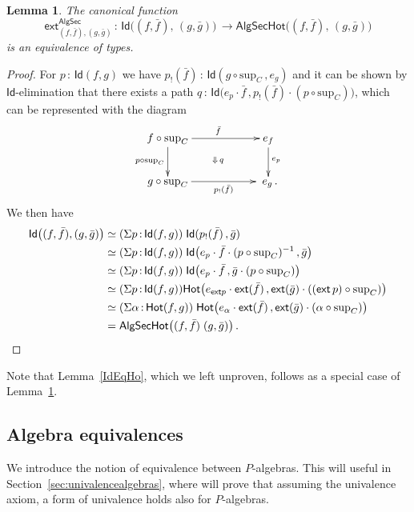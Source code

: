 \documentclass[10pt,a4paper,oneside,reqno]{amsart}
\numberwithin{equation}{section}
\theoremstyle{mythm}
\newtheorem{lemma}[theorem]{Lemma}
\theoremstyle{mydef}
\theoremstyle{myrmk}
\newcommand{\co}{\,{:}\,}
\newcommand{\ct}{\cdot}
\newcommand{\Hot}{\mathsf{Hot}}
\newcommand{\ext}{\mathsf{ext}}
\newcommand{\Id}{\mathsf{Id}}
\renewcommand{\sup}{\mathrm{sup}}
\newcommand{\PalgSec}{\mathsf{AlgSec}}
\newcommand{\AlgSecHot}{\mathsf{AlgSecHot}}
\begin{document}
\begin{lemma}\label{lem:fibhomeqid} The canonical function
\[
\ext^\PalgSec_{(f, \bar{f}), (g, \bar{g})} \co \Id \big( (f, \bar{f}) ,\, (g, \bar{g}) \big) \, \to
\AlgSecHot\big( (f, \bar{f}) ,\, (g, \bar{g}) \big) 
\]
is an equivalence of types.
\end{lemma}

\begin{proof} For $p \co \Id(f, g)$ we have  $p_{!}(\bar{f}) \co  \Id( g \circ \sup_C \, , e_g)$ 
and it can be shown by $\Id$-elimination that there exists a path 
$q  \co \Id\big(  e_p \ct \bar{f}   \, ,  p_{!}(\bar{f})  \ct  (p \circ \sup_C)    \big)$, 
which can be represented with the diagram
\[
\xymatrix@C=2cm{
f \circ \sup_C  \ar[d]_-{p \circ \sup_C}  \ar[r]^{\bar{f}}  \ar@{}[dr]|{\Downarrow \, q } & e_f 
\ar[d]^{ e_p}  \\
 g \circ \sup_C \ar[r]_-{ p_{!}(\bar{f}) }  & \; e_g \, .    }
\]
We then have
\begin{align*}
  \Id\big( (f,\bar{f}),  (g,\bar{g}) \big) 
& \simeq (\Sigma p \co \Id( f , g)) \; \Id ( p_{!} ( \bar{f} ) \, , \bar{g}  )  \\
& \simeq (\Sigma p \co \Id( f, g)) 
\; \Id\big(  
e_p \ct  \bar{f} \ct (p \circ \sup_C)^{-1} \, , \bar{g}     \big)   \\ 
& \simeq (\Sigma p \co \Id( f, g)) 
\; \Id\big( e_p  \ct \bar{f} \, ,   \bar{g} \ct ( p \circ \sup_C)   \big)   \\ 
& \simeq (\Sigma p \co \Id( f, g)) 
\Hot\big(  e_{\ext p} \ct \ext( \bar{f}) \, , 
 \ext( \bar{g}) \ct ( (\ext \, p) \circ \sup_C)   \big)  \\ 
&  \simeq (\Sigma \alpha \co \Hot( f, g)) \; 
\Hot\big(  e_\alpha \ct \ext( \bar{f}) \, , 
 \ext( \bar{g}) \ct (\alpha \circ \sup_C)   \big)  \\
&  =   \AlgSecHot \big( (f,\bar{f}) \; (g,\bar{g}) \big) \, . \qedhere
\end{align*}  
\end{proof}

Note that Lemma~\ref{IdEqHo}, which we left unproven, follows as a special case of Lemma~\ref{lem:fibhomeqid}. 

\subsection*{Algebra equivalences}  We introduce the notion of equivalence between $P$-algebras. This
will useful in Section~\ref{sec:univalencealgebras}, where will prove that assuming the univalence axiom, a form of univalence holds also for $P$-algebras. 
\end{document}

